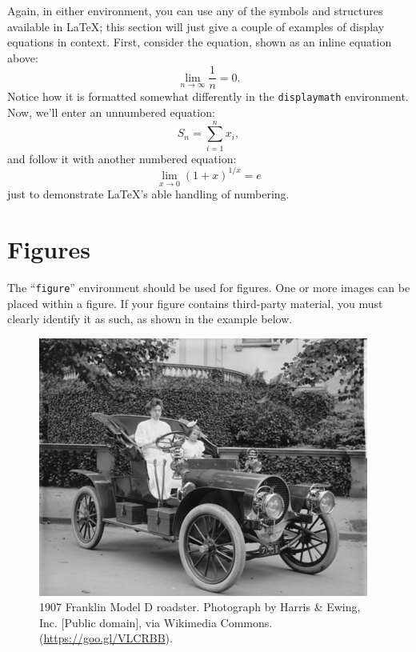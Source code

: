 \documentclass{ceurart}
\begin{document}
Again, in either environment, you can use any of the symbols and
structures available in \LaTeX{}; this section will just give a couple
of examples of display equations in context.  First, consider the
equation, shown as an inline equation above:
\begin{equation}
  \lim_{n\rightarrow \infty} \frac{1}{n} = 0.
\end{equation}
Notice how it is formatted somewhat differently in
the \verb|displaymath|
environment.  Now, we'll enter an unnumbered equation:
\begin{displaymath}
  S_{n} = \sum_{i=1}^{n} x_{i} ,
\end{displaymath}
and follow it with another numbered equation:
\begin{equation}
  \lim_{x \to 0} (1 + x)^{1/x} = e
\end{equation}
just to demonstrate \LaTeX's able handling of numbering.

\section{Figures}

The ``\verb|figure|'' environment should be used for figures. One or
more images can be placed within a figure. If your figure contains
third-party material, you must clearly identify it as such, as shown
in the example below.
\begin{figure}
  \centering
  \includegraphics[width=\linewidth]{sample-franklin}
  \caption{1907 Franklin Model D roadster. Photograph by Harris \&
    Ewing, Inc. [Public domain], via Wikimedia
    Commons. (\url{https://goo.gl/VLCRBB}).}
\end{figure}
\end{document}
